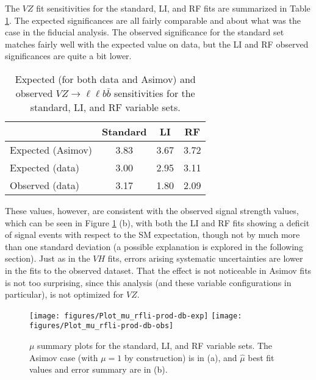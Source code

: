 The $VZ$ fit sensitivities for the standard, LI, and RF fits are summarized in Table \ref{tab:Sensitivitiesvz}.  The expected significances are all fairly comparable and about what was the case in the fiducial analysis.  The observed significance for the standard set matches fairly well with the expected value on data, but the LI and RF observed significances are quite a bit lower.

\begin{table}[!htbp]\captionsetup{justification=centering}
\begin{center}
\begin{tabular}{lccc}
\hline\hline
 & Standard &LI &RF\\
\hline
Expected (Asimov) & 3.83 & 3.67 & 3.72\\
\hline
Expected (data) & 3.00 & 2.95 & 3.11\\
\hline
Observed (data) & 3.17 & 1.80 & 2.09\\
\hline
\hline
\end{tabular}
\end{center}
\caption{Expected (for both data and Asimov) and observed $VZ\to\ell\ell b\bar{b}$ sensitivities for the standard, LI, and RF variable sets.}
\label{tab:Sensitivitiesvz}
\end{table}

These values, however, are consistent with the observed signal strength values, which can be seen in Figure \ref{fig:MuhatSummaryvz} (b), with both the LI and RF fits showing a deficit of signal events with respect to the SM expectation, though not by much more than one standard deviation (a possible explanation is explored in the following section).  Just as in the $VH$ fits, errors arising systematic uncertainties are lower in the fits to the observed dataset.  That the effect is not noticeable in Asimov fits is not too surprising, since this analysis (and these variable configurations in particular), is not optimized for $VZ$.

\begin{figure}[!htbp]\captionsetup{justification=centering}
  \centering
    \texttt{[image: figures/Plot\_mu\_rfli-prod-db-exp]}
    \texttt{[image: figures/Plot\_mu\_rfli-prod-db-obs]}
  \caption{$\mu$ summary plots for the standard, LI, and RF variable sets.  The Asimov case (with $\mu=1$ by construction) is in (a), and $\hat{\mu}$ best fit values and error summary are in (b).}
  \label{fig:MuhatSummaryvz}
\end{figure}

